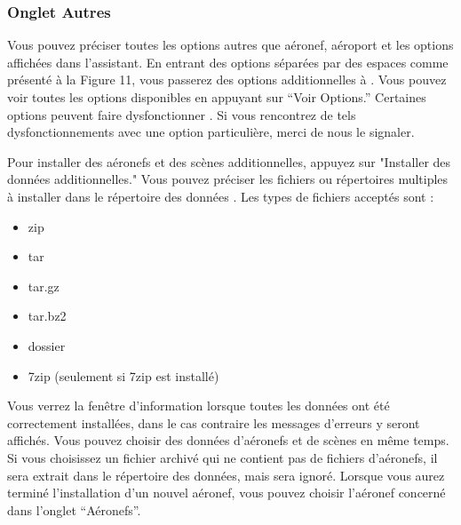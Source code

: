\begin{itemize}
{\subsubsection{Onglet Autres}
Vous pouvez pr\'{e}ciser toutes les options autres que a\'{e}ronef, a\'{e}roport et les options affich\'{e}es dans l'assistant. En entrant des options s\'{e}par\'{e}es par des espaces comme pr\'{e}sent\'{e} \`{a} la Figure 11, vous passerez des options additionnelles \`{a} \FlightGear{}. Vous pouvez voir toutes les options disponibles en appuyant sur ``Voir Options.'' Certaines options peuvent faire dysfonctionner \FlightGear{}. Si vous rencontrez de tels dysfonctionnements avec une option particuli\`{e}re, merci de nous le signaler.

Pour installer des a\'{e}ronefs et des sc\`{e}nes additionnelles, appuyez sur "Installer des donn\'{e}es additionnelles." Vous pouvez pr\'{e}ciser les fichiers ou r\'{e}pertoires multiples \`{a} installer dans le r\'{e}pertoire des donn\'{e}es \FlightGear{}. Les types de fichiers accept\'{e}s sont :
\begin{itemize}
\item zip
\item tar
\item tar.gz
\item tar.bz2
\item dossier
\item 7zip (seulement si 7zip est install\'{e})
\end{itemize}

Vous verrez la fen\^{e}tre d'information lorsque toutes les donn\'{e}es ont \'{e}t\'{e} correctement install\'{e}es, dans le cas contraire les messages d'erreurs y seront affich\'{e}s. Vous pouvez choisir des donn\'{e}es d'a\'{e}ronefs et de sc\`{e}nes en m\^{e}me temps. Si vous choisissez un fichier archiv\'{e} qui ne contient pas de fichiers d'a\'{e}ronefs, il sera extrait dans le r\'{e}pertoire des donn\'{e}es, mais sera ignor\'{e}. Lorsque vous aurez termin\'{e} l'installation d'un nouvel a\'{e}ronef, vous pouvez choisir l'a\'{e}ronef concern\'{e} dans l'onglet ``A\'{e}ronefs''.
}{}

\end{itemize}
